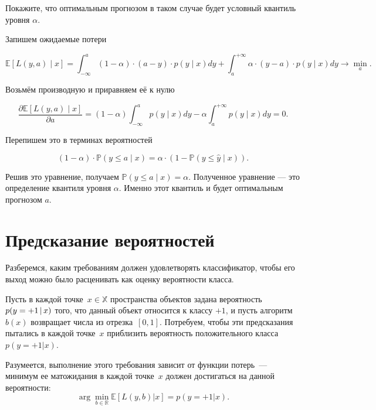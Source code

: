\documentclass[12pt,a4paper]{article}
\begin{document}
\begin{vkProblem}
    Покажите, что оптимальным прогнозом в таком случае будет условный квантиль уровня $\alpha$.
\end{vkProblem}

\begin{esSolution}

Запишем ожидаемые потери

\[
\mathbb{E}\left[ L(y, a) \mid x \right] = \int_{-\infty}^{a} (1 - \alpha) \cdot (a - y) \cdot  p(y \mid x) dy  + \int_{a}^{+\infty} \alpha \cdot (y - a) \cdot  p(y \mid x) dy \to \min_{a}.
\]

Возьмём производную и приравняем её к нулю 

\[
\frac{\partial \mathbb{E}\left[ L(y, a) \mid x \right]}{\partial a} =  (1 - \alpha) \int_{-\infty}^{a}  p(y \mid x) dy -  \alpha \int_{a}^{+ \infty}  p(y \mid x) dy = 0.
\]

Перепишем это в терминах вероятностей

\[ 
(1 - \alpha) \cdot \mathbb{P}(y \le a \mid x) = \alpha \cdot (1 - \mathbb{P}(y \le \hat y \mid x)).
\]

Решив это уравнение, получаем $\mathbb{P}(y \le a \mid x) = \alpha$. Полученное уравнение --- это определение квантиля уровня $\alpha$. Именно этот квантиль и будет оптимальным прогнозом $a$. 
\end{esSolution}

\section{Предсказание вероятностей}

\par Разберемся, каким требованиям должен удовлетворять классификатор, чтобы его выход можно было расценивать как оценку вероятности класса.

\par Пусть в каждой точке~$x \in \mathbb{X}$ пространства объектов
задана вероятность~$p(y=+1 \mspace{3mu}{|}\mspace{3mu} x)$ того, что данный объект относится
к классу $+1$, и пусть алгоритм~$b(x)$ возвращает числа из отрезка~$[0, 1]$. Потребуем, чтобы эти предсказания пытались в каждой точке~$x$ приблизить вероятность положительного класса~$p(y = +1 | x)$.
\par Разумеется, выполнение этого требования зависит от функции потерь~---
минимум ее матожидания в каждой точке~$x$ должен достигаться на данной вероятности:
$$\arg \min_{b \in \mathbb{R}} \mathbb{E} \left[ L(y, b)|x \right] = p(y=+1|x).$$
\end{document}
